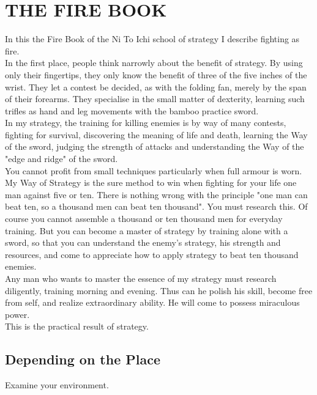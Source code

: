\chapter{THE FIRE BOOK}

In this the Fire Book of the Ni To Ichi school of strategy I describe fighting as fire.\\

In the first place, people think narrowly about the benefit of strategy. By using only their fingertips, they only know the benefit of three of the five inches of the wrist. They let a contest be decided, as with the folding fan, merely by the span of their forearms. They specialise in the small matter of dexterity, learning such trifles as hand and leg movements with the bamboo practice sword.\\

In my strategy, the training for killing enemies is by way of many contests, fighting for survival, discovering the meaning of life and death, learning the Way of the sword, judging the strength of attacks and understanding the Way of the "edge and ridge" of the sword.\\

You cannot profit from small techniques particularly when full armour is worn. My Way of Strategy is the sure method to win when fighting for your life one man against five or ten. There is nothing wrong with the principle "one man can beat ten, so a thousand men can beat ten thousand". You must research this. Of course you cannot assemble a thousand or ten thousand men for everyday training. But you can become a master of strategy by training alone with a sword, so that you can understand the enemy's strategy, his strength and resources, and come to appreciate how to apply strategy to beat ten thousand enemies.\\

Any man who wants to master the essence of my strategy must research diligently, training morning and evening. Thus can he polish his skill, become free from self, and realize extraordinary ability. He will come to possess miraculous power.\\

This is the practical result of strategy.\\
\section{Depending on the Place}

Examine your environment.\\

